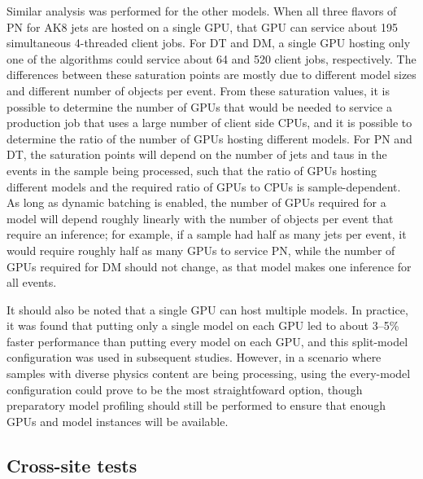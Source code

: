 Similar analysis was performed for the other models. When all three flavors of PN for AK8 jets are hosted on a single GPU, that GPU can service about 195 simultaneous 4-threaded client jobs. For DT and DM, a single GPU hosting only one of the algorithms could service about 64 and 520 client jobs, respectively. The differences between these saturation points are mostly due to different model sizes and different number of objects per event. From these saturation values, it is possible to determine the number of GPUs that would be needed to service a production job that uses a large number of client side CPUs, and it is possible to determine the ratio of the number of GPUs hosting different models. For PN and DT, the saturation points will depend on the number of jets and taus in the events in the sample being processed, such that the ratio of GPUs hosting different models and the required ratio of GPUs to CPUs is sample-dependent. As long as dynamic batching is enabled, the number of GPUs required for a model will depend roughly linearly with the number of objects per event that require an inference; for example, if a sample had half as many jets per event, it would require roughly half as many GPUs to service PN, while the number of GPUs required for DM should not change, as that model makes one inference for all events.

It should also be noted that a single GPU can host multiple models. In practice, it was found that putting only a single model on each GPU led to about 3--5\% faster performance than putting every model on each GPU, and this split-model configuration was used in subsequent studies. However, in a scenario where samples with diverse physics content are being processing, using the every-model configuration could prove to be the most straightfoward option, though preparatory model profiling should still be performed to ensure that enough GPUs and model instances will be available.

\subsection{Cross-site tests}
\label{sec:different_sites}

